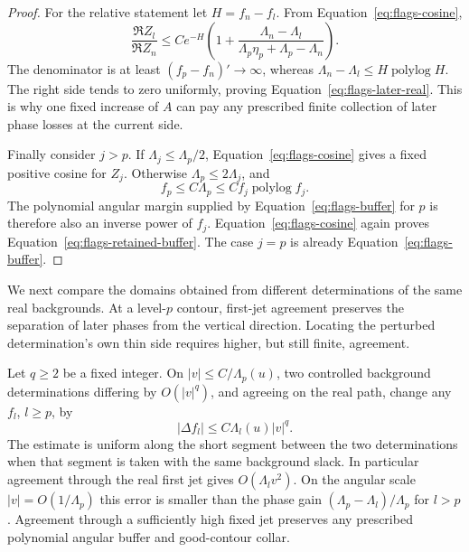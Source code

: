 \begin{proof}
For the relative statement let $H=f_n-f_l$. From
Equation~\eqref{eq:flags-cosine},
\[
 \frac{\Re Z_l}{\Re Z_n}
 \le C e^{-H}\left(
  1+\frac{\Lambda_n-\Lambda_l}
  {\Lambda_p\eta_p+\Lambda_p-\Lambda_n}\right).
\]
The denominator is at least
$(f_p-f_n)'\to\infty$, whereas
$\Lambda_n-\Lambda_l\le H\operatorname{polylog}H$.
The right side tends to zero uniformly, proving
Equation~\eqref{eq:flags-later-real}. This is why one fixed
increase of $A$ can pay any prescribed finite collection of later
phase losses at the current side.

Finally consider $j>p$. If
$\Lambda_j\le\Lambda_p/2$, Equation~\eqref{eq:flags-cosine}
gives a fixed positive cosine for $Z_j$. Otherwise
$\Lambda_p\le2\Lambda_j$, and
\[
 f_p\le C\Lambda_p\le C f_j\operatorname{polylog}f_j.
\]
The polynomial angular margin supplied by
Equation~\eqref{eq:flags-buffer} for $p$ is therefore also an
inverse power of $f_j$. Equation~\eqref{eq:flags-cosine} again
proves Equation~\eqref{eq:flags-retained-buffer}. The case $j=p$
is already Equation~\eqref{eq:flags-buffer}.
\end{proof}

We next compare the domains obtained from different determinations of
the same real backgrounds. At a level-$p$ contour, first-jet agreement
preserves the separation of later phases from the vertical direction.
Locating the perturbed determination's own thin side requires higher,
but still finite, agreement.

\begin{lemma}\label{lem:flags-background}
Let $q\ge2$ be a fixed integer. On
$|v|\le C/\Lambda_p(u)$, two controlled background
determinations differing by $O(|v|^q)$, and agreeing on the real
path, change any $f_l$, $l\ge p$, by
\begin{equation}\label{eq:flags-background}
 |\Delta f_l|\le C\Lambda_l(u)|v|^q.
\end{equation}
The estimate is uniform along the short segment between the two
determinations when that segment is taken with the same background
slack. In particular agreement through the real first jet gives
$O(\Lambda_l v^2)$. On the angular scale $|v|=O(1/\Lambda_p)$
this error is smaller than the phase gain $(\Lambda_p-\Lambda_l)/\Lambda_p$ for $l>p$.
Agreement through a sufficiently high fixed jet preserves any
prescribed polynomial angular buffer and good-contour collar.
\end{lemma}

